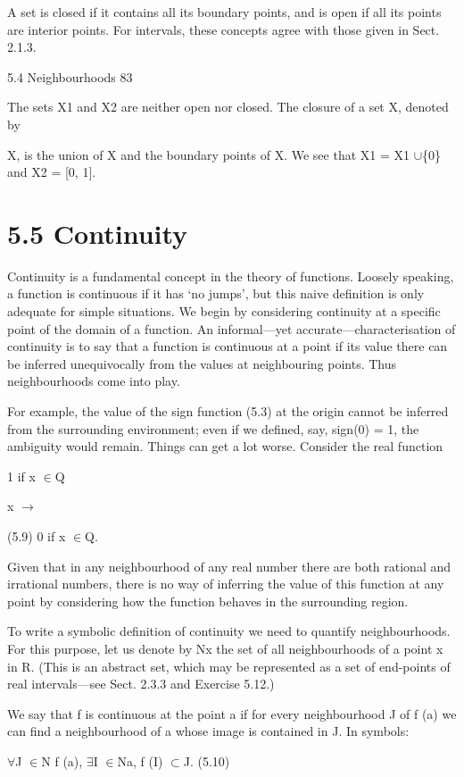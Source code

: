 \documentclass[11pt]{article}
\theoremstyle{plain}
\theoremstyle{definition}
\begin{document}
A set is closed if it contains all its boundary points, and is open if all its points are interior points. For intervals, these concepts agree with those given in Sect. 2.1.3.

5.4 Neighbourhoods 83

The sets X1 and X2 are neither open nor closed. The closure of a set X, denoted by

X, is the union of X and the boundary points of X. We see that X1 = X1 $\cup$\{0\} and X2 = [0, 1].

\section{5.5 Continuity}

Continuity is a fundamental concept in the theory of functions. Loosely speaking, a function is continuous if it has `no jumps', but this naive definition is only adequate for simple situations. We begin by considering continuity at a specific point of the domain of a function. An informal---yet accurate---characterisation of continuity is to say that a function is continuous at a point if its value there can be inferred unequivocally from the values at neighbouring points. Thus neighbourhoods come into play.

For example, the value of the sign function (5.3) at the origin cannot be inferred from the surrounding environment; even if we defined, say, sign(0) = 1, the ambiguity would remain. Things can get a lot worse. Consider the real function

1 if x $\in$Q

x $\to$

(5.9) 0 if x $\in$Q.

Given that in any neighbourhood of any real number there are both rational and irrational numbers, there is no way of inferring the value of this function at any point by considering how the function behaves in the surrounding region.

To write a symbolic definition of continuity we need to quantify neighbourhoods. For this purpose, let us denote by Nx the set of all neighbourhoods of a point x in R. (This is an abstract set, which may be represented as a set of end-points of real intervals---see Sect. 2.3.3 and Exercise 5.12.)

We say that f is continuous at the point a if for every neighbourhood J of f (a) we can find a neighbourhood of a whose image is contained in J. In symbols:

$\forall$J $\in$N f (a), $\exists$I $\in$Na, f (I) $\subset$J. (5.10)
\end{document}
